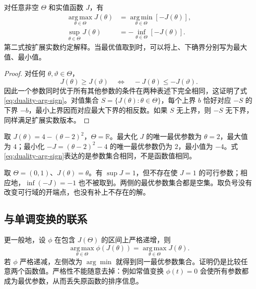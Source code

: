 \documentclass[UTF8,12pt,a4paper,fontset=fandol]{ctexart}
\begin{document}
\begin{theorem}[目标取负的等价性]
\label{thm:duality-sign}
对任意非空 $\Theta$ 和实值函数 $J$，有
\begin{align}
 \operatorname*{arg\,max}_{\theta\in\Theta}J(\theta)
 &=\operatorname*{arg\,min}_{\theta\in\Theta}[-J(\theta)],
 \label{eq:duality-arg-sign}\\
 \sup_{\theta\in\Theta}J(\theta)
 &=-\inf_{\theta\in\Theta}[-J(\theta)].
 \label{eq:duality-value-sign}
\end{align}
第二式按扩展实数约定解释。当最优值取到时，可以将上、下确界分别写为最大值、最小值。
\end{theorem}
\begin{proof}
对任何 $\theta,\vartheta\in\Theta$，
\[
 J(\theta)\geq J(\vartheta)
 \quad\Longleftrightarrow\quad
 -J(\theta)\leq-J(\vartheta).
\]
因此一个参数同时优于所有其他参数的条件在两种表述下完全相同，这证明了式\eqref{eq:duality-arg-sign}。对值集合 $S=\{J(\theta):\theta\in\Theta\}$，每个上界 $b$ 恰好对应 $-S$ 的下界 $-b$，最小上界因而对应最大下界的相反数。如果 $S$ 无上界，则 $-S$ 无下界，同样满足扩展实数版本。
\end{proof}

\begin{example}
取 $J(\theta)=4-(\theta-2)^2$，$\Theta=\mathbb R$。最大化 $J$ 的唯一最优参数为 $\theta=2$，最大值为 $4$；最小化 $-J=(\theta-2)^2-4$ 的唯一最优参数仍为 $2$，最小值为 $-4$。式\eqref{eq:duality-arg-sign}表达的是参数集合相同，不是函数值相同。
\end{example}

\begin{example}[等价变换不会创造最优解]
取 $\Theta=(0,1)$、$J(\theta)=\theta$。有 $\sup J=1$，但不存在使 $J=1$ 的可行参数；相应地，$\inf(-J)=-1$ 也不被取到。两侧的最优参数集合都是空集。取负号没有改变可行域的开端点，也没有补上不存在的解。
\end{example}

\subsection{与单调变换的联系}

更一般地，设 $\phi$ 在包含 $J(\Theta)$ 的区间上严格递增，则
\[
 \operatorname*{arg\,max}_{\theta\in\Theta}\phi(J(\theta))
 =\operatorname*{arg\,max}_{\theta\in\Theta}J(\theta).
\]
若 $\phi$ 严格递减，左侧改为 $\arg\min$ 就得到同一最优参数集合。证明仍是比较任意两个函数值。严格性不能随意去掉：例如常值变换 $\phi(t)=0$ 会使所有参数都成为最优参数，从而丢失原函数的排序信息。
\end{document}

